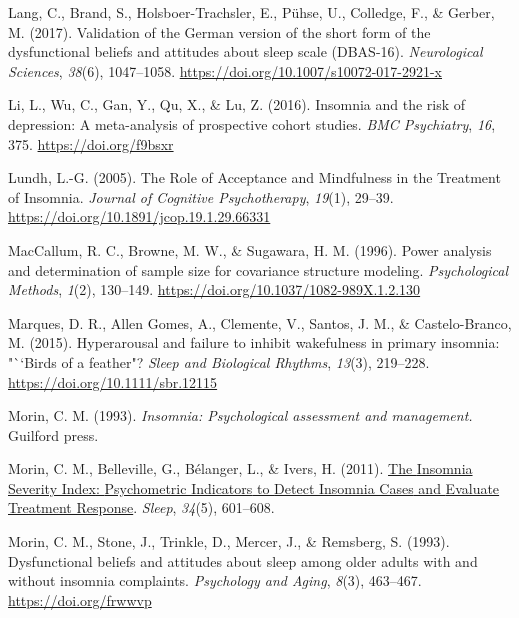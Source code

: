 \documentclass[
  ,doc,11pt, twoside,floatsintext]{apa6}
\newlength{\cslhangindent}
\newlength{\cslentryspacingunit} %
\newenvironment{CSLReferences}[2] %
 {%
  \setlength{\parindent}{0pt}
  \ifodd #1
  \let\oldpar\par
  \def\par{\hangindent=\cslhangindent\oldpar}
  \fi
  \setlength{\parskip}{#2\cslentryspacingunit}
 }%
 {}
\begin{document}
\begin{CSLReferences}{1}{0}
\leavevmode{}%
Lang, C., Brand, S., Holsboer-Trachsler, E., Pühse, U., Colledge, F., \& Gerber, M. (2017). Validation of the {German} version of the short form of the dysfunctional beliefs and attitudes about sleep scale ({DBAS-16}). \emph{Neurological Sciences}, \emph{38}(6), 1047--1058. \url{https://doi.org/10.1007/s10072-017-2921-x}

\leavevmode{}%
Li, L., Wu, C., Gan, Y., Qu, X., \& Lu, Z. (2016). Insomnia and the risk of depression: A meta-analysis of prospective cohort studies. \emph{BMC Psychiatry}, \emph{16}, 375. \url{https://doi.org/f9bsxr}

\leavevmode{}%
Lundh, L.-G. (2005). The {Role} of {Acceptance} and {Mindfulness} in the {Treatment} of {Insomnia}. \emph{Journal of Cognitive Psychotherapy}, \emph{19}(1), 29--39. \url{https://doi.org/10.1891/jcop.19.1.29.66331}

\leavevmode{}%
MacCallum, R. C., Browne, M. W., \& Sugawara, H. M. (1996). Power analysis and determination of sample size for covariance structure modeling. \emph{Psychological Methods}, \emph{1}(2), 130--149. \url{https://doi.org/10.1037/1082-989X.1.2.130}

\leavevmode{}%
Marques, D. R., Allen Gomes, A., Clemente, V., Santos, J. M., \& Castelo-Branco, M. (2015). Hyperarousal and failure to inhibit wakefulness in primary insomnia: "``Birds of a feather"? \emph{Sleep and Biological Rhythms}, \emph{13}(3), 219--228. \url{https://doi.org/10.1111/sbr.12115}

\leavevmode{}%
Morin, C. M. (1993). \emph{Insomnia: Psychological assessment and management.} Guilford press.

\leavevmode{}%
Morin, C. M., Belleville, G., Bélanger, L., \& Ivers, H. (2011). \href{https://www.ncbi.nlm.nih.gov/pmc/articles/PMC3079939}{The {Insomnia Severity Index}: {Psychometric Indicators} to {Detect Insomnia Cases} and {Evaluate Treatment Response}}. \emph{Sleep}, \emph{34}(5), 601--608.

\leavevmode{}%
Morin, C. M., Stone, J., Trinkle, D., Mercer, J., \& Remsberg, S. (1993). Dysfunctional beliefs and attitudes about sleep among older adults with and without insomnia complaints. \emph{Psychology and Aging}, \emph{8}(3), 463--467. \url{https://doi.org/frwwvp}


\end{CSLReferences}
\end{document}
